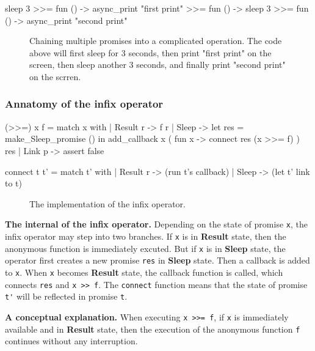 \begin{verbbox}
  sleep 3 >>=
  fun () -> async_print "first print" >>=
  fun () -> sleep 3 >>=
  fun () -> async_print "second print"
\end{verbbox}

\begin{figure}[!h]
\resizebox{0.95\columnwidth}{!}{\theverbbox}
\caption{Chaining multiple promises into a complicated operation. The code above
  will first sleep for 3 seconds, then print "first print" on the screen, then
  sleep another 3 seconds, and finally print "second print" on the scrren.} 
\label{fig:example}
\end{figure}

\subsubsection{Annatomy of the infix operator}

\begin{verbbox}
(>>=) x f =
  match x with
  | Result r -> f r
  | Sleep ->
    let res = make_Sleep_promise () in
    add_callback x ( fun x -> connect res (x >>= f) )
    res
  | Link p ->
    assert false

connect t t' =
  match t' with
  | Result r -> (run t's callback)
  | Sleep ->
    (let t' link to t)
  
\end{verbbox}
\begin{figure}[!h]
\resizebox{0.95\columnwidth}{!}{\theverbbox}
\caption{The implementation of the infix operator. } %
\label{fig:infix-internal}
\end{figure}

\noindent \textbf{The internal of the infix operator.} Depending on the state of
promise \verb!x!, the infix operator may step into two branches. If \verb!x! is
in \textbf{Result} state, then the anonymous function is immediately
excuted. But if \verb!x! is in \textbf{Sleep} state, the operator first creates a new
promise \verb!res! in \textbf{Sleep} state. Then a callback is added to \verb!x!. When
\verb!x! becomes \textbf{Result} state, the callback function is called, which
connects \verb!res! and \verb!x >> f!. The \verb!connect! function means that
the state of promise \verb!t'! will be reflected in promise \verb!t!.

\noindent \textbf{A conceptual explanation.} When executing \verb!x >>= f!, if
\verb!x! is immediately available and in \textbf{Result} state, then the
execution of the anonymous function \verb!f! continues without any
interruption.

